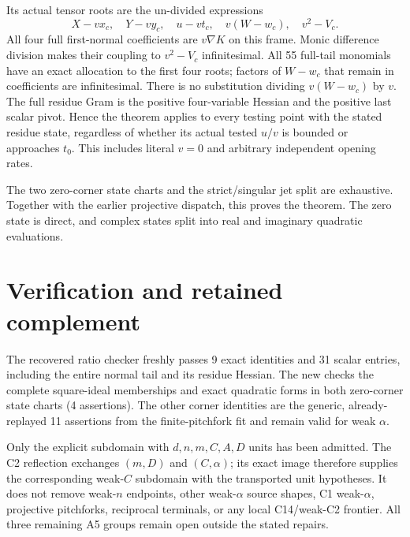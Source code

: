 Its actual tensor roots are the un-divided expressions
\[
 X-vx_c,\quad Y-vy_c,\quad u-vt_c,\quad v(W-w_c),
 \quad v^2-V_c.
\]
All four full first-normal coefficients are $v\nabla K$ on this
frame. Monic difference division makes their coupling to $v^2-V_c$
infinitesimal. All 55 full-tail monomials have an exact allocation to
the first four roots; factors of $W-w_c$ that remain in coefficients
are infinitesimal. There is no substitution dividing $v(W-w_c)$ by
$v$. The full residue Gram is the positive four-variable Hessian and
the positive last scalar pivot. Hence the theorem applies to every
testing point with the stated residue state, regardless of whether its
actual tested $u/v$ is bounded or approaches $t_0$. This includes literal
$v=0$ and arbitrary independent opening rates.

The two zero-corner state charts and the strict/singular jet split
are exhaustive. Together with the earlier projective dispatch, this
proves the theorem. The zero state is direct, and complex states split
into real and imaginary quadratic evaluations.

\section*{Verification and retained complement}

The recovered ratio checker freshly passes 9 exact identities and
31 scalar entries, including the entire normal tail and its residue
Hessian. The new  checks the
complete square-ideal memberships and exact quadratic forms in both
zero-corner state charts (4 assertions). The other corner identities
are the generic, already-replayed 11 assertions from the finite-pitchfork
fit and remain valid for weak $\alpha$.

Only the explicit subdomain with $d,n,m,C,A,D$ units has been admitted.
The C2 reflection exchanges $(m,D)$ and $(C,\alpha)$; its exact image
therefore supplies the corresponding weak-$C$ subdomain with the
transported unit hypotheses. It does not remove weak-$n$ endpoints,
other weak-$\alpha$ source shapes, C1 weak-$\alpha$, projective
pitchforks, reciprocal terminals, or any local C14/weak-C2 frontier.
All three remaining A5 groups remain open outside the stated repairs.
